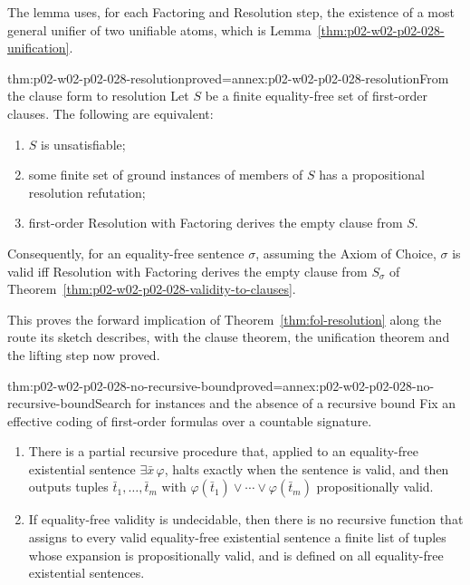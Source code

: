 The lemma uses, for each Factoring and Resolution step, the existence of a
most general unifier of two unifiable atoms, which is
Lemma~\ref{thm:p02-w02-p02-028-unification}.

\begin{hbtheorem}{thm:p02-w02-p02-028-resolution}{proved=annex:p02-w02-p02-028-resolution}{From the clause form to resolution}
Let \(S\) be a finite equality-free set of first-order clauses.  The
following are equivalent:
\begin{enumerate}
  \item \(S\) is unsatisfiable;
  \item some finite set of ground instances of members of \(S\) has a
        propositional resolution refutation;
  \item first-order Resolution with Factoring derives the empty clause from
        \(S\).
\end{enumerate}
Consequently, for an equality-free sentence \(\sigma\), assuming the Axiom of
Choice, \(\sigma\) is valid iff Resolution with Factoring derives the empty
clause from \(S_\sigma\) of
Theorem~\ref{thm:p02-w02-p02-028-validity-to-clauses}.
\end{hbtheorem}

This proves the forward implication of Theorem~\ref{thm:fol-resolution}
along the route its sketch describes, with the clause theorem, the
unification theorem and the lifting step now proved.

\begin{hbcorollary}{thm:p02-w02-p02-028-no-recursive-bound}{proved=annex:p02-w02-p02-028-no-recursive-bound}{Search for instances and the absence of a recursive bound}
Fix an effective coding of first-order formulas over a countable signature.
\begin{enumerate}
  \item There is a partial recursive procedure that, applied to an
        equality-free existential sentence \(\exists\bar x\,\varphi\), halts
        exactly when the sentence is valid, and then outputs tuples
        \(\bar t_1,\ldots,\bar t_m\) with
        \(\varphi(\bar t_1)\lor\cdots\lor\varphi(\bar t_m)\) propositionally
        valid.
  \item If equality-free validity is undecidable, then there is no recursive
        function that assigns to every valid equality-free existential
        sentence a finite list of tuples whose expansion is propositionally
        valid, and is defined on all equality-free existential sentences.
\end{enumerate}
\end{hbcorollary}

